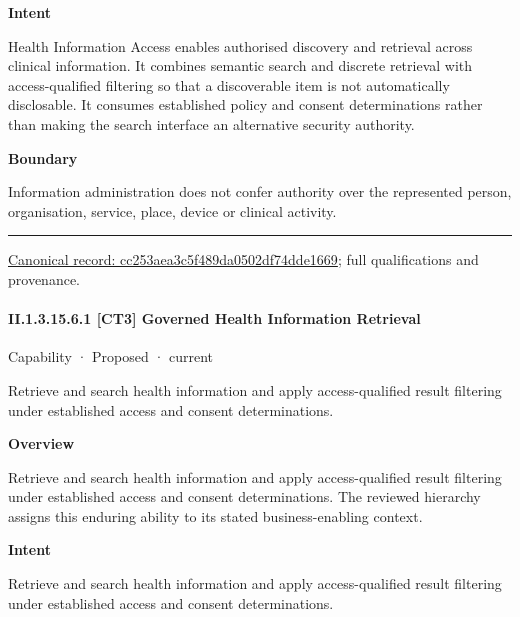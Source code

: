 \textbf{Intent}



Health Information Access enables authorised discovery and retrieval across clinical information. It combines semantic search and discrete retrieval with access-qualified filtering so that a discoverable item is not automatically disclosable. It consumes established policy and consent determinations rather than making the search interface an alternative security authority.



\textbf{Boundary}



Information administration does not confer authority over the represented person, organisation, service, place, device or clinical activity.



\medskip\hrule\medskip

{\footnotesize \href{../../../../continuum/strategy/capability/cc253aea3c5f489da0502df74dde1669.md}{Canonical record: cc253aea3c5f489da0502df74dde1669}; full qualifications and provenance.}\par
\paragraph*{II.1.3.15.6.1 [CT3] Governed Health Information Retrieval}
\label{navigation:II.1.3.15.6.1}

\label{element:76e74e46ca4d44a1a7bb116b358f231c}
{\small Capability · Proposed · current}\par

Retrieve and search health information and apply access-qualified result filtering under established access and consent determinations.



\textbf{Overview}



Retrieve and search health information and apply access-qualified result filtering under established access and consent determinations. The reviewed hierarchy assigns this enduring ability to its stated business-enabling context.



\textbf{Intent}



Retrieve and search health information and apply access-qualified result filtering under established access and consent determinations.



